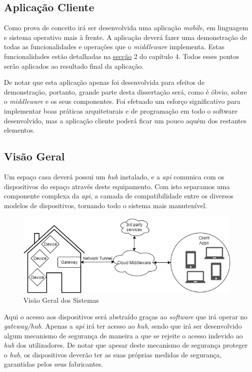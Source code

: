 \subsection{Aplicação Cliente}

Como prova de conceito irá ser desenvolvida uma aplicação \textit{mobile}, em linguagem e sistema operativo mais à frente. A aplicação deverá fazer uma demonstração de todas as funcionalidades e operações que o \textit{middleware} implementa. Estas funcionalidades estão detalhadas na \hyperref[sec:funcionalidades]{secção} 2 do capítulo 4. Todos esses pontos serão aplicados ao resultado final da aplicação.

De notar que esta aplicação apenas foi desenvolvida para efeitos de demonstração, portanto, grande parte desta dissertação será, como é óbvio, sobre o \textit{middleware} e os seus componentes. Foi efetuado um esforço significativo para implementar boas práticas arquiteturais e de programação em todo o software desenvolvido, mas a aplicação cliente poderá ficar um pouco aquém dos restantes elementos.

\subsection{Visão Geral}

Um espaço casa deverá possui um \textit{hub} instalado, e a \textit{api} comunica com os dispositivos do espaço através deste equipamento. Com isto separamos uma componente complexa da \textit{api}, a camada de compatibilidade entre os diversos modelos de dispositivos, tornando todo o sistema mais manutenível.

\begin{figure}[H]
  \centering
        \includegraphics[scale=0.7]{img/arquitetura.jpg}
  \caption{Visão Geral dos Sistemas}
\end{figure}

Aqui o acesso aos dispositivos será abstraído graças ao \textit{software} que irá operar no \textit{gateway/hub}. Apenas a \textit{api} irá ter acesso ao \textit{hub}, sendo que irá ser desenvolvido algum mecanismo de segurança de maneira a que se rejeite o acesso indevido ao \textit{hub} dos utilizadores. De notar que apesar deste mecanismo de segurança proteger o \textit{hub}, os dispositivos deverão ter as suas próprias medidas de segurança, garantidas pelos seus fabricantes.

